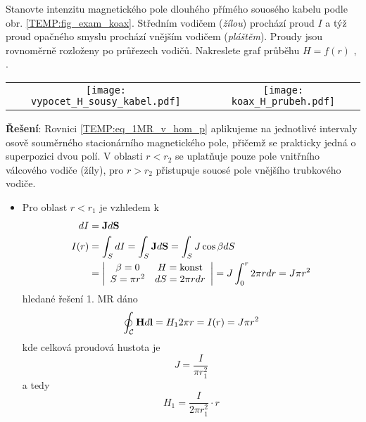 \begin{example}\label{TEMP:ex_koax_H}
  Stanovte intenzitu magnetického pole dlouhého přímého souosého kabelu podle obr.
  \ref{TEMP:fig_exam_koax}. Středním vodičem (\emph{žílou}) prochází proud $I$ a týž proud 
  opačného smyslu prochází vnějším vodičem (\emph{pláštěm}). Proudy jsou rovnoměrně rozloženy po 
  průřezech vodičů. Nakreslete graf průběhu $H = f(r)$ \cite[s.~92]{Dufek1970},
  \cite[s.~195]{Kotlan1999}.
  
  {\centering
   \begin{tabular}{cc}
     \texttt{[image: vypocet\_H\_sousy\_kabel.pdf]}   &
     \texttt{[image: koax\_H\_prubeh.pdf]}
  \end{tabular}
  \captionsetup{type=figure}
  \label{TEMP:fig_exam_koax}
  \par}
  
  \textbf{Řešení}: \newline Rovnici \ref{TEMP:eq_1MR_v_hom_p} aplikujeme na jednotlivé intervaly 
  osově souměrného stacionárního magnetického pole, přičemž se prakticky jedná o superpozici dvou
  polí. V oblasti $r<r_2$ se uplatňuje pouze pole vnitřního válcového vodiče (žíly), pro $r>r_2$ 
  přistupuje souosé pole vnějšího trubkového vodiče.
  \begin{itemize}
    \item Pro oblast $r<r_1$ je vzhledem k 
          \begin{align*}
              dI   &= \mathbf{J}d\mathbf{S} \\
              I(r) &= \int_S dI = \int_S \mathbf{J}d\mathbf{S} = \int_S J\cos\beta dS \\
                   &= \left|\begin{array}{cc}
                               \beta = 0 & H = \text{konst} \\
                             S = \pi r^2 & dS = 2\pi rdr \\
                            \end{array}
                      \right| = J\int_0^r 2\pi rdr = J\pi r^2
          \end{align*}
          hledané řešení 1. MR dáno 
          $$\oint_\mathcal{C}\mathbf{H}d\mathbf{l} = H_1 2\pi r = I(r) = J\pi r^2$$ kde celková proudová
          hustota je  $$J = \frac{I}{\pi r_1^2}$$ a tedy $$H_1 = \frac{I}{2\pi r_1^2}\cdot r$$
          

\end{itemize}
\end{example}
